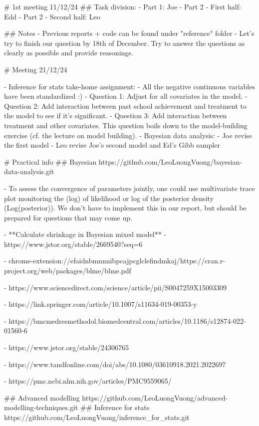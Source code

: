 \documentclass{article}
\begin{document}
\begin{markdown}
# 1st meeting 11/12/24
## Task division:
- Part 1: Joe
- Part 2 - First half: Edd
- Part 2 - Second half: Leo

## Notes
- Previous reports + code can be found under "reference" folder
- Let's try to finish our question by 18th of December. Try to answer the questions as clearly as possible and provide reasonings.

# Meeting 21/12/24

- Inference for stats take-home assignment:
  - All the negative continuous variables have been standardized :)
  - Question 1: Adjust for all covariates in the model.
  - Question 2: Add interaction between past school achievement and treatment to the model to see if it's significant.
  - Question 3: Add interaction between treatment and other covariates. This question boils down to the model-building exercise (cf. the lecture on model building).
- Bayesian data analysis:
  - Joe revise the first model 
  - Leo revise Joe's second model and Ed's Gibb sampler

# Practical info
## Bayesian
https://github.com/LeoLuongVuong/bayesian-data-analysis.git

- To assess the convergence of parameters jointly, one could use multivariate trace plot monitoring the (log) of likelihood or log of the posterior density (Log(posterior)). We don't have to implement this in our report, but should be prepared for questions that may come up. 

- **Calculate shrinkage in Bayesian mixed model**
    - https://www.jstor.org/stable/2669540?seq=6
    
    - chrome-extension://efaidnbmnnnibpcajpcglclefindmkaj/https://cran.r-project.org/web/packages/blme/blme.pdf
    
    - https://www.sciencedirect.com/science/article/pii/S0047259X15003309
    
    - https://link.springer.com/article/10.1007/s11634-019-00353-y
    
    - https://bmcmedresmethodol.biomedcentral.com/articles/10.1186/s12874-022-01560-6
    
    - https://www.jstor.org/stable/24306765
    
    - https://www.tandfonline.com/doi/abs/10.1080/03610918.2021.2022697
    
    - https://pmc.ncbi.nlm.nih.gov/articles/PMC9559065/

## Advanced modelling
https://github.com/LeoLuongVuong/advanced-modelling-techniques.git
## Inference for stats
https://github.com/LeoLuongVuong/inference_for_stats.git

\end{markdown}
\end{document}
